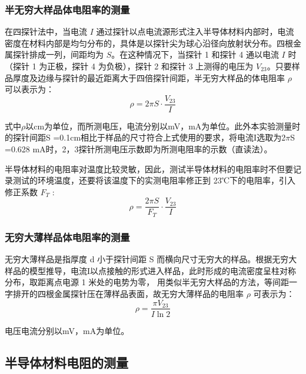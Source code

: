 \documentclass[a4paper,utf8]{article}
\begin{document}
        \subsubsection{半无穷大样品体电阻率的测量}
            
            在四探针法中，当电流 $I$ 通过探针以点电流源形式注入半导体材料内部时，电流密度在材料内部是均匀分布的，具体是以探针尖为球心沿径向放射状分布。四根金属探针排成一列，间距均为 $S$。在这种情况下，当探针 1 和探针 4 通以电流 $I$ 时（探针 1 为正极，探针 4 为负极），探针 2 和探针 3 上测得的电压为 $V_{23}$。只要样品厚度及边缘与探针的最近距离大于四倍探针间距，半无穷大样品的体电阻率 $\rho$ 可以表示为：            \begin{equation*}
                \rho = 2\pi S\cdot\frac{V_{23}}{I} \label{eq:0}
            \end{equation*} 
            
            式中$\rho $以cm为单位，而所测电压，电流分别以mV，mA为单位。此外本实验测量时的探针间距S =0.1cm相比于样品的尺寸符合上式使用的要求，将电流I选取为2$ \pi $S =0.628 mA时，2，3探针所测电压示数即为所测电阻率的示数（直读法）。
            
            半导体材料的电阻率对温度比较灵敏，因此，测试半导体材料的电阻率时不但要记录测试的环境温度，还要将该温度下的实测电阻率修正到 23℃下的电阻率，引入修正系数 $F_T$ : 
            \begin{equation*}
                \rho =\frac{2\pi S}{F_T}\cdot\frac{V_{23}}{I}
            \end{equation*}
        \subsubsection{无穷大薄样品体电阻率的测量}
        无穷大薄样品是指厚度 d 小于探针间距 S 而横向尺寸无穷大的样品。根据无穷大样品的模型推导，电流I以点接触的形式进入样品，此时形成的电流密度呈柱对称分布，取距离点电源 1 米处的电势为零，
        用类似半无穷大样品的方法，等间距一字排开的四根金属探针压在薄样品表面，故无穷大薄样品的电阻率 $\rho$ 可表示为：
            \begin{equation*}
                \rho =\frac{\pi V_{23}}{I \ln 2} \label{eq:1}
            \end{equation*}

        电压电流分别以mV，mA为单位。
    \subsection{半导体材料电阻的测量}        
\end{document}
